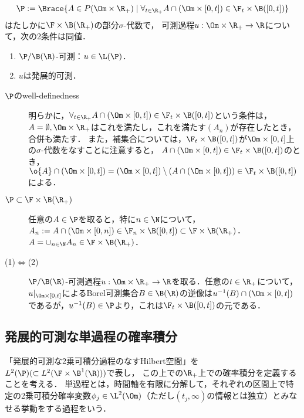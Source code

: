 \documentclass[uplatex,dvipdfmx]{jsreport}
\begin{document}
\begin{theorem}[発展的可測性の特徴付け]
    \[\P:=\Brace{A\in P(\Om\times\R_+)\mid\forall_{t\in\R_+} A\cap(\Om\times[0,t])\in\F_t\times\B([0,t])}\]
    はたしかに$\F\times\B(\R_+)$の部分$\sigma$-代数で，
    可測過程$u:\Om\times\R_+\to\R$について，次の2条件は同値．
    \begin{enumerate}
        \item $\P/\B(\R)$-可測：$u\in\L(\P)$．
        \item $u$は発展的可測．
    \end{enumerate}
\end{theorem}
\begin{Proof}\mbox{}
    \begin{description}
        \item[$\P$のwell-definedness] 明らかに，$\forall_{t\in\R_+} A\cap(\Om\times[0,t])\in\F_t\times\B([0,t])$という条件は，$A=\emptyset,\Om\times\R_+$はこれを満たし，これを満たす$(A_n)$が存在したとき，合併も満たす．
        また，補集合については，$\F_t\times\B([0,t])$が$\Om\times[0,t]$上の$\sigma$-代数をなすことに注意すると，
        $A\cap(\Om\times[0,t])\in\F_t\times\B([0,t])$のとき，
        $\o{A}\cap(\Om\times[0,t])=(\Om\times[0,t])\setminus (A\cap(\Om\times[0,t]))\in\F_t\times\B([0,t])$による．
        \item[$\P\subset\F\times\B(\R_+)$] 
        任意の$A\in\P$を取ると，特に$n\in\N$について，$A_n:=A\cap(\Om\times[0,n])\in\F_n\times\B([0,t])\subset\F\times\B(\R_+)$．
        $A=\cup_{n\in\N}A_n\in\F\times\B(\R_+)$．
        \item[(1)$\Leftrightarrow$(2)] $\P/\B(\R)$-可測過程$u:\Om\times\R_+\to\R$を取る．任意の$t\in\R_+$について，$u|_{\Om\times[0,t]}$によるBorel可測集合$B\in\B(\R)$の逆像は$u^{-1}(B)\cap(\Om\times[0,t])$であるが，$u^{-1}(B)\in\P$より，これは$\F_t\times\B([0,t])$の元である．
    \end{description}
\end{Proof}

\subsection{発展的可測な単過程の確率積分}

\begin{tcolorbox}[colframe=ForestGreen, colback=ForestGreen!10!white,breakable,colbacktitle=ForestGreen!40!white,coltitle=black,fonttitle=\bfseries\sffamily,
title=]
    「発展的可測な2乗可積分過程のなすHilbert空間」を$L^2(\P)(\subset L^2(\F\times\B^1(\R)))$で表し，
    この上での$\R_+$上での確率積分を定義することを考える．
    単過程とは，時間軸を有限に分解して，それぞれの区間上で特定の2乗可積分確率変数$\phi_j\in\L^2(\Om)$（ただし$(t_j,\infty)$の情報とは独立）とみなせる挙動をする過程をいう．
\end{tcolorbox}
\end{document}
